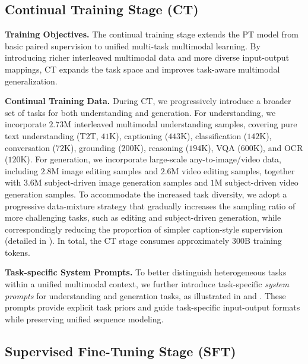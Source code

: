\documentclass{llmxive}
\begin{document}
\subsection{Continual Training Stage (CT)}

\textbf{Training Objectives.}
The continual training stage extends the PT model from basic paired supervision to unified multi-task multimodal learning. By introducing richer interleaved multimodal data and more diverse input-output mappings, CT expands the task space and improves task-aware multimodal generalization.



\textbf{Continual Training Data.}
During CT, we progressively introduce a broader set of tasks for both understanding and generation. For understanding, we incorporate $2.73$M interleaved multimodal understanding samples, covering pure text understanding (T2T, $41$K), captioning ($443$K), classification ($142$K), conversation ($72$K), grounding ($200$K), reasoning ($194$K), VQA ($600$K), and OCR ($120$K). For generation, we incorporate large-scale any-to-image/video data, including $2.8$M image editing samples and $2.6$M video editing samples, together with $3.6$M subject-driven image generation samples and $1$M subject-driven video generation samples. To accommodate the increased task diversity, we adopt a progressive data-mixture strategy that gradually increases the sampling ratio of more challenging tasks, such as editing and subject-driven generation, while correspondingly reducing the proportion of simpler caption-style supervision (detailed in ). In total, the CT stage consumes approximately $300$B training tokens.


\textbf{Task-specific System Prompts.}
To better distinguish heterogeneous tasks within a unified multimodal context, we further introduce task-specific \textit{system prompts} for understanding and generation tasks, as illustrated in  and . These prompts provide explicit task priors and guide task-specific input-output formats while preserving unified sequence modeling.










\subsection{Supervised Fine-Tuning Stage (SFT)}
\end{document}
